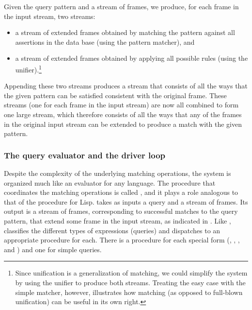 Given the query pattern and a stream of frames, we produce, for each frame in
the input stream, two streams:

\begin{itemize}
\item
a stream of extended frames obtained by matching the pattern against all
assertions in the data base (using the pattern matcher), and

\item
a stream of extended frames obtained by applying all possible rules (using the
unifier).\footnote{Since unification is a generalization of matching, we could
simplify the system by using the unifier to produce both streams.  Treating the
easy case with the simple matcher, however, illustrates how matching (as
opposed to full-blown unification) can be useful in its own right.}
\end{itemize}

\noindent
Appending these two streams produces a stream that consists of all the ways
that the given pattern can be satisfied consistent with the original frame.
These streams (one for each frame in the input stream) are now all combined to
form one large stream, which therefore consists of all the ways that any of the
frames in the original input stream can be extended to produce a match with the
given pattern.

\subsubsection*{The query evaluator and the driver loop}

Despite the complexity of the underlying matching operations, the system is
organized much like an evaluator for any language.  The procedure that
coordinates the matching operations is called , and it plays a role
analogous to that of the  procedure for Lisp.   takes as
inputs a query and a stream of frames.  Its output is a stream of frames,
corresponding to successful matches to the query pattern, that extend some
frame in the input stream, as indicated in .  Like ,
 classifies the different types of expressions (queries) and
dispatches to an appropriate procedure for each.  There is a procedure for each
special form (, , , and ) and one
for simple queries.


